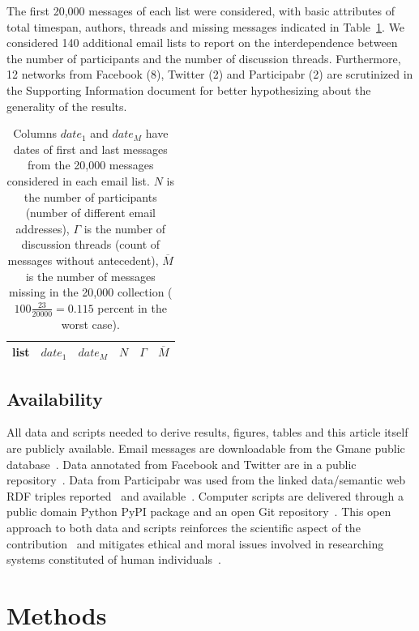 \documentclass[%
	aip,
	jmp,%
	amsmath,amssymb,
	reprint,%
]{revtex4-1}
\begin{document}
The first 20,000 messages of each list were considered,
with basic attributes of total timespan, authors, threads and missing messages indicated in Table~\ref{tab:genLists}.
We considered 140 additional email lists to
report on the interdependence between the number of participants and 
the number of discussion threads.
Furthermore, 12 networks from Facebook (8), Twitter (2) and Participabr (2)
are scrutinized in the Supporting Information document for better hypothesizing
about the generality of the results.

\begin{table}
	\centering
	\caption{Columns $date_1$ and $date_M$ have dates of first and last messages from the 20,000 messages considered in each email list.
		$N$ is the number of participants (number of different email addresses),
		$\Gamma$ is the number of discussion threads (count of messages without antecedent),
		$\overline{M}$ is the number of messages missing in the 20,000 collection
		($100\frac{23}{20000}=0.115$ percent in the worst case).
	}
	\label{tab:genLists}
	\begin{tabular}{|l|c|c|c|c|c|}\hline
		list & $date_1$ & $date_{M}$    & $N$  & $\Gamma$ & $\overline{M}$ \\\hline
		
	\end{tabular}
\end{table}
\subsection{Availability}
All data and scripts needed to derive results, figures, tables and this article itself
are publicly available.
Email messages are downloadable from the Gmane public database~\cite{Gmanewikipedia}.
Data annotated from Facebook and Twitter are in a public repository~\cite{fbtwData}.
Data from Participabr was used from the linked data/semantic web RDF triples
reported~\cite{opa} and available~\cite{datahub}.
Computer scripts are delivered through a public domain Python PyPI package and
an open Git repository~\cite{gmanePack}.
This open approach to both data and scripts
reinforces the scientific aspect of the contribution~\cite{openSci}
and mitigates ethical and moral issues involved in researching 
systems constituted of
human individuals~\cite{anPhy,ccs15}.

\section{Methods}\label{sec:carac}
\end{document}
